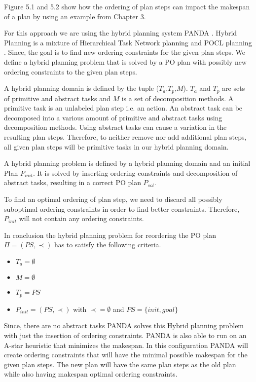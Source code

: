 Figure 5.1 and 5.2 show how the ordering of plan steps can impact the makespan of a plan by using an example from Chapter 3.

For this approach we are using the hybrid planning system PANDA \cite{Panda}.
Hybrid Planning is a mixture of Hierarchical Task Network planning \cite{HTN} and POCL planning \cite{McAllester}.
Since, the goal is to find new ordering constraints for the given plan steps.
We define a hybrid planning problem that is solved by a 
PO plan with possibly new ordering constraints to the given plan steps.
 
A hybrid planning domain is defined by the tuple ($T_a$,$T_p$,$M$).
$T_a$ and $T_p$ are sets of primitive and abstract tasks and $M$ is a set of decomposition methods.
A primitive task is an unlabeled plan step i.e. an action.
An abstract task can be decomposed into a various amount of primitive and abstract tasks using decomposition methods.
Using abstract tasks can cause a variation in the resulting plan steps.
Therefore, to neither remove nor add additional plan steps, all given plan steps will be primitive tasks in our
hybrid planning domain.

A hybrid planning problem is defined by a hybrid planning domain and an initial Plan $P_{init}$.
It is solved by inserting ordering constraints and decomposition of abstract tasks, resulting in
a correct PO plan $P_{sol}$.

To find an optimal ordering of plan step, we need to discard all possibly suboptimal ordering constraints
in order to find better constraints.
Therefore, $P_{init}$  will not contain any ordering constraints. 

In conclusion the hybrid planning problem for reordering the PO plan $\Pi=(PS,\prec)$ has to satisfy the following criteria.

\begin{itemize}
    \item $T_a=\emptyset$
    \item $M=\emptyset$
    \item $T_p=PS$ 
    \item $P_{init}=(PS,\prec)$ with $\prec=\emptyset$ and $PS=\{init,goal\}$
\end{itemize}

Since, there are no abstract tasks PANDA solves this Hybrid planning problem with just the insertion of ordering constraints.
PANDA is also able to run on an A-star heuristic that minimizes the makespan.
In this configuration PANDA will create ordering constraints that will have the minimal possible makespan for 
the given plan steps.
The new plan will have the same plan steps as the old plan while also having makespan optimal ordering constraints.

